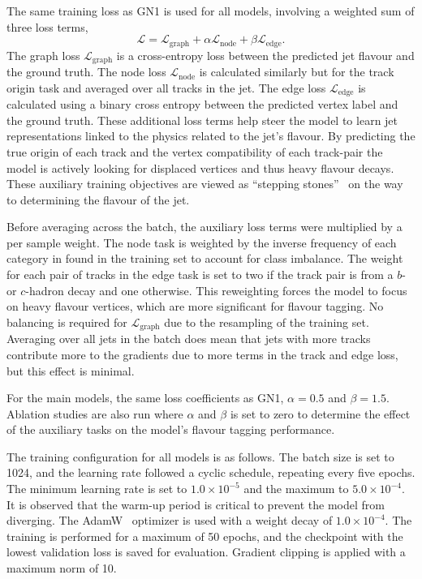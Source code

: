 The same training loss as GN1 is used for all models, involving a weighted sum of three loss terms,
\begin{equation}
    \mathcal{L} = \mathcal{L}_{\text{graph}} + \alpha \mathcal{L}_{\text{node}} + \beta \mathcal{L}_{\text{edge}}.
\end{equation}
The graph loss $\mathcal{L}_{\text{graph}}$ is a cross-entropy loss between the predicted jet flavour and the ground truth.
The node loss $\mathcal{L}_{\text{node}}$ is calculated similarly but for the track origin task and averaged over all tracks in the jet.
The edge loss $\mathcal{L}_{\text{edge}}$ is calculated using a binary cross entropy between the predicted vertex label and the ground truth.
These additional loss terms help steer the model to learn jet representations linked to the physics related to the jet's flavour.
By predicting the true origin of each track and the vertex compatibility of each track-pair the model is actively looking for displaced vertices and thus heavy flavour decays.
These auxiliary training objectives are viewed as ``stepping stones''~\cite{GN1} on the way to determining the flavour of the jet.

Before averaging across the batch, the auxiliary loss terms were multiplied by a per sample weight.
The node task is weighted by the inverse frequency of each category in  found in the training set to account for class imbalance.
The weight for each pair of tracks in the edge task is set to two if the track pair is from a $b$- or $c$-hadron decay and one otherwise.
This reweighting forces the model to focus on heavy flavour vertices, which are more significant for flavour tagging.
No balancing is required for $\mathcal{L}_{\text{graph}}$ due to the resampling of the training set.
Averaging over all jets in the batch does mean that jets with more tracks contribute more to the gradients due to more terms in the track and edge loss, but this effect is minimal.

For the main models, the same loss coefficients as GN1, $\alpha = 0.5$ and $\beta = 1.5$.
Ablation studies are also run where $\alpha$ and $\beta$ is set to zero to determine the effect of the auxiliary tasks on the model's flavour tagging performance.

The training configuration for all models is as follows.
The batch size is set to 1024, and the learning rate followed a cyclic schedule, repeating every five epochs.
The minimum learning rate is set to $1.0 \times 10^{-5}$ and the maximum to $5.0 \times 10^{-4}$.
It is observed that the warm-up period is critical to prevent the model from diverging.
The AdamW~\cite{AdamW} optimizer is used with a weight decay of $1.0 \times 10^{-4}$.
The training is performed for a maximum of 50 epochs, and the checkpoint with the lowest validation loss is saved for evaluation.
Gradient clipping is applied with a maximum norm of 10.

